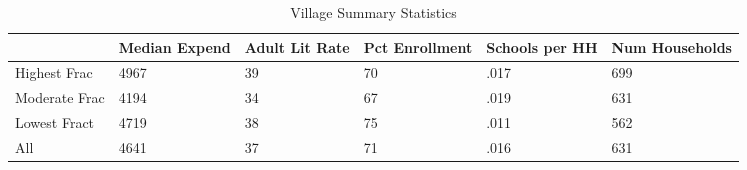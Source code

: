 \begin{table}[htbp]
\caption{\label{vsummary} Village Summary Statistics}\centering\medskip
\begin{tabular}{|l|l|l|l|l|l|}\hline  
 & Median Expend  & Adult Lit Rate  & Pct Enrollment  & Schools per HH  & Num Households  \\ \hline  
Highest Frac &      4967 &        39 &        70 &      .017 &       699 \\ \hline 
Moderate Frac &      4194 &        34 &        67 &      .019 &       631 \\ \hline 
Lowest Fract &      4719 &        38 &        75 &      .011 &       562 \\ \hline 
All &      4641 &        37 &        71 &      .016 &       631 \\ \hline 
  \end{tabular}
\end{table}
